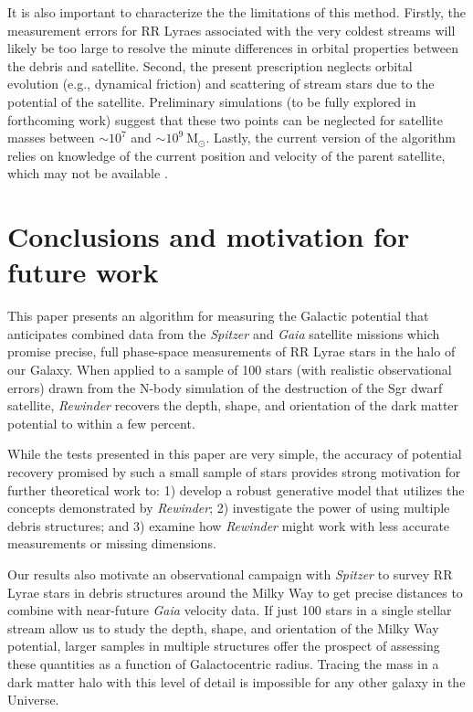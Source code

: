 It is also important to characterize the the limitations of this
method. Firstly, the measurement errors for RR Lyraes associated with
the very coldest streams \citep[e.g., the globular clusters Pal5 and
  GD1;][]{odenkirchen02,koposov10} will likely be too large to resolve
the minute differences in orbital properties between the debris and
satellite. Second, the present prescription neglects orbital evolution (e.g.,
dynamical friction) and scattering of stream stars due to the potential
of the satellite. Preliminary simulations (to be fully explored in 
forthcoming work) suggest that these two points can be neglected 
for satellite masses between $\sim$$10^7$ and $\sim$$10^9~\mathrm{M}_{\odot}$. Lastly, the 
current version of the algorithm relies on knowledge of the current 
position and velocity of the parent satellite, which may not be available 
\citep[e.g., the Orphan Stream;][]{belokurov07}. 

\section{Conclusions and motivation for future work}
\label{sec:conclusion}

This paper presents an algorithm for measuring the Galactic potential
that anticipates combined data from the {\it Spitzer} and {\it Gaia} satellite
missions which promise precise, full phase-space measurements of RR
Lyrae stars in the halo of our Galaxy. When applied to a sample of 100
stars (with realistic observational errors) drawn from the
\cite{law10} N-body simulation of the destruction of the Sgr dwarf
satellite, \emph{Rewinder} recovers the depth, shape, and orientation of the dark
matter potential to within a few percent.

While the tests presented in this paper are very simple, the accuracy of potential recovery promised by such a small sample of stars 
provides strong motivation for further theoretical work to: 1) develop a robust generative model that utilizes the concepts demonstrated by \emph{Rewinder}; 2) investigate the power of using multiple debris structures; and 3) examine how \emph{Rewinder} might work with less accurate measurements or missing dimensions. 

Our results also motivate an observational campaign with {\it Spitzer} to survey RR Lyrae stars in debris structures around the Milky Way to get precise distances to combine with near-future {\it Gaia} velocity data. 
If just 100 stars in a single stellar stream allow us to study the depth, shape, and orientation of the Milky Way potential, larger samples in multiple structures \citep[e.g., the Orphan Stream;][]{sesar13} offer the prospect of assessing these quantities as a function of Galactocentric radius. Tracing the mass in a dark matter halo with this level of detail is impossible for any other galaxy in the Universe.

